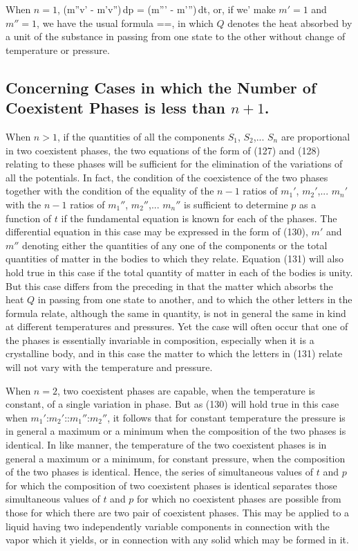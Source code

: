 \documentclass[12pt]{article}
\begin{document}
When $n= 1$,
\eqs (m''v' - m'v'')\,dp = (m''\eta' - m'\eta'')\,dt, \label{130}\eqe
or, if we' make $m'= 1$ and $m''= 1$, we have the usual formula
\eqs 
{}==, \label{131}\eqe
in which $Q$ denotes the heat absorbed by a unit of the substance in passing from one state to the other without change of temperature or pressure.

\subsection{Concerning Cases in which the Number of Coexistent Phases is less than $n+ 1$.}
When $n > 1$, if the quantities of all the components $S_1$, $S_2$,... $S_n$ are proportional in two coexistent phases, the two equations of the form of (127) and (128) relating to these phases will be sufficient for the elimination of the variations of all the potentials. In fact, the condition of the coexistence of the two phases together with the condition of the equality of the $n-1$ ratios of $m_1'$, $m_2'$,... $m_n'$ with the $n-1$ ratios of $m_1''$, $m_2''$,... $m_n''$ is sufficient to determine $p$ as a function of $t$ if the fundamental equation is known for each of the phases. The differential equation in this case may be expressed in the form of (130), $m'$ and $m''$ denoting either the quantities of any one of the components or the total quantities of matter in the bodies to which they relate. Equation (131) will also hold true in this case if the total quantity of matter in each of the bodies is unity. But this case differs from the preceding in that the matter which absorbs the heat $Q$ in passing from one state to another, and to which the other letters in the formula relate, although the same in quantity, is not in general the same in kind at different temperatures and pressures. Yet the case will often occur that one of the phases is essentially invariable in composition, especially when it is a crystalline body, and in this case the matter to which the letters in (131) relate will not vary with the temperature and pressure.


When $n=2$, two coexistent phases are capable, when the temperature is constant, of a single variation in phase. But as (130) will hold true in this case when $m_1'$:$m_2'$::$m_1''$:$m_2''$, it follows that for constant temperature the pressure is in general a maximum or a minimum when the composition of the two phases is identical. In like manner, the temperature of the two coexistent phases is in general a maximum or a minimum, for constant pressure, when the composition of the two phases is identical. Hence, the series of simultaneous values of $t$ and $p$ for which the composition of two coexistent phases is identical separates those simultaneous values of $t$ and $p$ for which no coexistent phases are possible from those for which there are two pair of coexistent phases. This may be applied to a liquid having two independently variable components in connection with the vapor which it yields, or in connection with any solid which may be formed in it.
\end{document}
